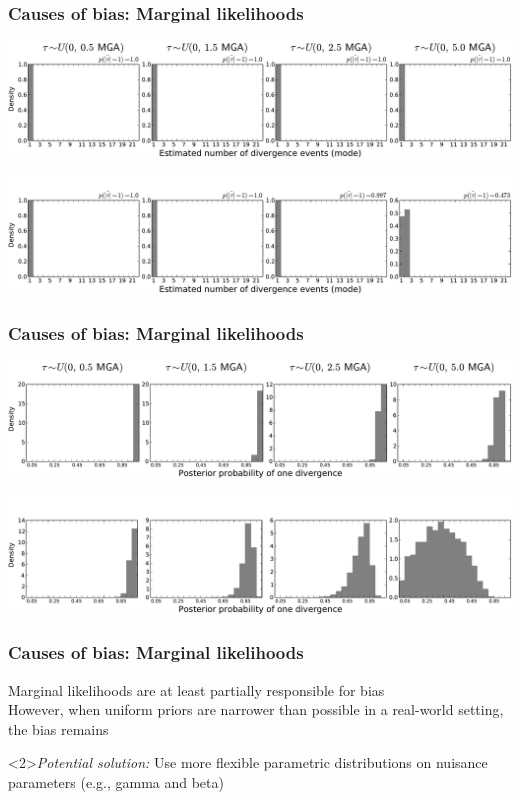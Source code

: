 \begin{frame}[t]
    \frametitle{Causes of bias: Marginal likelihoods}
    \vspace{1cm}
        \centerline{
        \includegraphics[width=\textwidth]{images/old-sims_power_psi_mode.pdf}}
        \vspace{0mm}
        \centerline{
        \includegraphics[width=\textwidth]{images/old-sims-inform10_power_psi_mode_headless.pdf}}
\end{frame}

\begin{frame}[t]
    \frametitle{Causes of bias: Marginal likelihoods}
    \vspace{1cm}
        \centerline{
        \includegraphics[width=\textwidth]{images/old-sims_power_psi_prob.pdf}}
        \vspace{0mm}
        \centerline{
        \includegraphics[width=\textwidth]{images/old-sims-inform10_power_psi_prob_headless.pdf}}
\end{frame}

\begin{frame}
    \frametitle{Causes of bias: Marginal likelihoods}
    Marginal likelihoods are at least partially responsible for bias\\
    \bigskip
    However, when uniform priors are narrower than possible in a real-world
    setting, the bias remains
    \bigskip
    \begin{block}<2>{\it Potential solution:}
        Use more flexible parametric distributions on nuisance parameters
        (e.g., gamma and beta)
    \end{block}
\end{frame}

